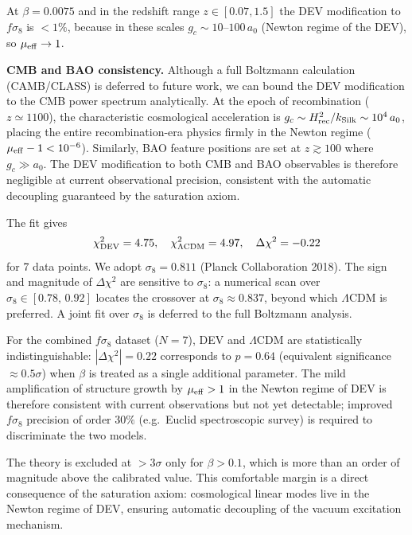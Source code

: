 \documentclass[aps,prd,twocolumn,showpacs,superscriptaddress]{revtex4-2}
\newcommand{\aO}{a_0}
\newcommand{\mueff}{\mu_{\rm eff}}
\newcommand{\LCDM}{$\Lambda$CDM}
\begin{document}
At $\beta = 0.0075$ and in the redshift range $z\in[0.07, 1.5]$
the DEV modification to $f\sigma_8$ is $< 1\%$,
because in these scales $g_c \sim 10$--$100\,\aO$
(Newton regime of the DEV), so $\mueff \to 1$.

\textbf{CMB and BAO consistency.}
Although a full Boltzmann calculation (CAMB/CLASS) is deferred
to future work, we can bound the DEV modification to the
CMB power spectrum analytically.
At the epoch of recombination ($z \simeq 1100$), the
characteristic cosmological acceleration is
$g_c \sim H_{\rm rec}^2 / k_{\rm Silk} \sim 10^4\,\aO$,
placing the entire recombination-era physics firmly in
the Newton regime ($\mueff - 1 < 10^{-6}$).
Similarly, BAO feature positions are set at $z \gtrsim 100$
where $g_c \gg \aO$.
The DEV modification to both CMB and BAO observables
is therefore negligible at current observational precision,
consistent with the automatic decoupling guaranteed by
the saturation axiom.

The fit gives
\begin{equation}
  \chi^2_{\rm DEV} = 4.75, \quad
  \chi^2_{\Lambda{\rm CDM}} = 4.97, \quad
  \Delta\chi^2 = -0.22
\end{equation}
for 7 data points.
We adopt $\sigma_8 = 0.811$ (Planck Collaboration 2018).
The sign and magnitude of $\Delta\chi^2$ are sensitive to
$\sigma_8$: a numerical scan over $\sigma_8\in[0.78,\,0.92]$
locates the crossover at $\sigma_8\approx 0.837$, beyond which
\LCDM{} is preferred. A joint fit over $\sigma_8$ is deferred
to the full Boltzmann analysis.

For the combined $f\sigma_8$ dataset ($N=7$), DEV and \LCDM{}
are statistically indistinguishable: $|\Delta\chi^2|=0.22$
corresponds to $p=0.64$ (equivalent significance $\approx 0.5\sigma$)
when $\beta$ is treated as a single additional parameter. The
mild amplification of structure growth by $\mu_{\rm eff}>1$ in
the Newton regime of DEV is therefore consistent with current
observations but not yet detectable; improved $f\sigma_8$
precision of order $30\%$ (e.g.\ Euclid spectroscopic survey)
is required to discriminate the two models.

The theory is excluded at $>3\sigma$ only for $\beta > 0.1$,
which is more than an order of magnitude above the calibrated value.
This comfortable margin is a direct consequence of the saturation
axiom: cosmological linear modes live in the Newton regime of DEV,
ensuring automatic decoupling of the vacuum excitation mechanism.
\end{document}
